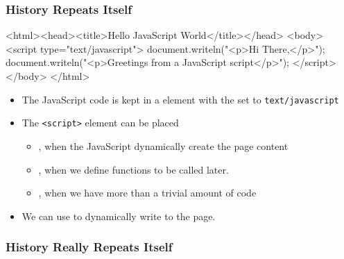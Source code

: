 \documentclass[dvipsnames]{beamer}
\begin{document}
\begin{frame}[fragile=singleslide]
  \frametitle{History Repeats Itself}
  
  \begin{small}
\begin{semiverbatim}\color{gray}
<html><head><title>Hello JavaScript World</title></head>
<body>
 {\color{black}<script type="text/javascript">
  document.writeln("<p>Hi There,</p>");
  document.writeln("<p>Greetings from a JavaScript script</p>");   
 </script>} 
</body>
</html>
\end{semiverbatim}
  \end{small}

  \begin{itemize}
  \item The JavaScript code is kept in a 
    element with the  set to
    \texttt{text/javascript}
  \item The \texttt{<script>} element can be placed
    \begin{itemize}
    \item {}, when the JavaScript
      dynamically create the page content
    \item {}, when we define functions
      to be called later.
    \item {}, when we have more than a trivial amount
      of code
    \end{itemize}
  \item We can use  to dynamically
    write to the page.
  \end{itemize}
\end{frame}


\begin{frame}[fragile=singleslide] 
\frametitle{History Really Repeats Itself}

\begin{footnotesize}
\end{footnotesize}
\end{frame}
\end{document}
